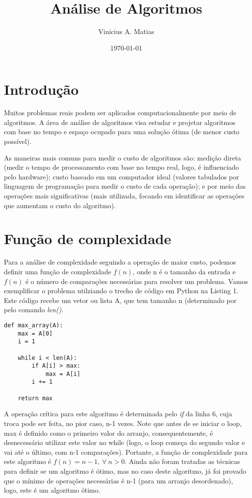 \documentclass[ a4paper, twocolumn]{article}
\title{Análise de Algoritmos}
\author{Vinicius A. Matias}
\date{\today}
\begin{document}
\maketitle

\section{Introdução}
Muitos problemas reais podem ser aplicados computacionalmente por meio de algoritmos. A área de análise de algoritmos visa estudar e projetar algoritmos com base no tempo e espaço ocupado para uma solução ótima (de menor custo possível). 

As maneiras mais comuns para medir o custo de algoritmos são: medição direta (medir o tempo de processamento com base no tempo real, logo, é influenciado pelo hardware); custo baseado em um computador ideal (valores tabulados  por linguagem de programação para medir o custo de cada operação); e por meio das operações mais significativas (mais utilizada, focando em identificar as operações que aumentam o custo do algoritmo).

\section{Função de complexidade}

Para a análise de complexidade seguindo a operação de maior custo, podemos definir uma função de complexidade $f(n)$, onde n é o tamanho da entrada e $f(n)$ é o número de comparações necessárias para resolver um problema. Vamos exemplificar o problema utilziando o trecho de código em Python na Listing 1. Este código recebe um vetor ou lista A, que tem tamanho n (determinado por pelo comando \textit{len()}.

\begin{lstlisting}[label=max_array,caption= Maior valor de um arranjo]
def max_array(A):
    max = A[0]
    i = 1
    
    while i < len(A):
        if A[i] > max:
            max = A[i]  
        i += 1
    
    return max
\end{lstlisting}

A operação crítica para este algoritmo é determinada pelo \textit{if} da linha 6, cuja troca pode ser feita, no pior caso, n-1 vezes. Note que antes de se iniciar o loop, max é definido como o primeiro valor do arranjo, consequentemente, é desnecessário utilizar este valor no while (logo, o loop começa do segundo valor e vai até o último, com n-1 comparações). Portante, a função de complexidade para este algoritmo é $f(n) = n - 1, \ \forall \ n>0$. Ainda não foram tratadas as técnicas para definir se um algoritmo é ótimo, mas no caso deste algoritmo, já foi provado que o mínimo de operações necessárias é n-1 (para um arranjo desordenado), logo, este é um algoritmo ótimo.
\end{document}
